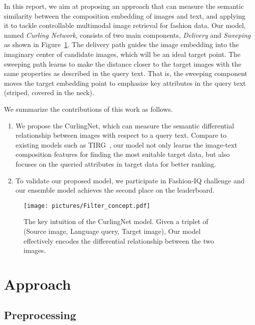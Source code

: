 \documentclass[10pt,twocolumn,letterpaper]{article}
\begin{document}
In this report, we aim at proposing an approach that can measure the semantic similarity between the composition embedding of images and text, and applying it to tackle controllable multimodal image retrieval for fashion data.
Our model, named \textit{Curling Network}, consists of two main components, \textit{Delivery} and \textit{Sweeping} as shown in Figure~\ref{fig:keyidea}.
The delivery path guides the image embedding into the imaginary center of candidate images, which will be an ideal target point.
The sweeping path learns to make the distance closer to the target images with the same properties as described in the query text.
That is,  the sweeping component moves the target embedding point to emphasize key attributes in the query text (\eg striped, covered in the neck). 

We summarize the contributions of this work as follows.

\begin{enumerate}
  \vspace{-3pt}\item We propose the CurlingNet, which can measure the semantic differential relationship between images with respect to a query text. Compare to existing models such as TIRG~\cite{vo-cvpr-2019}, our model not only learns the  image-text composition features for finding the most suitable target data, but also focuses on the queried attributes in target data for better ranking.

\vspace{-3pt}\item To validate our proposed model, we participate in Fashion-IQ challenge and our ensemble model achieves the second place on the leaderboard. 
\end{enumerate}

\begin{figure}[t]
\centering
\texttt{[image: pictures/Filter\_concept.pdf]}
\caption{
The key intuition of the CurlingNet model. 
Given a triplet of (Source image, Language query, Target image), 
Our model effectively encodes the differential relationship between the two images.
}
\label{fig:keyidea}
\end{figure}


\section{Approach}

\subsection{Preprocessing}
\end{document}
